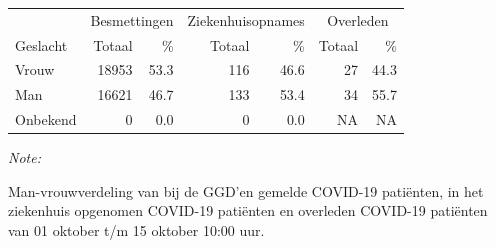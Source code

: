 \documentclass[
  english,
  man,floatsintext]{apa6}
\begin{document}
\begin{table}
\centering\begingroup\fontsize{11}{13}\selectfont

\begin{threeparttable}
\begin{tabular}{lrrrrrr}
\toprule
\multicolumn{1}{c}{ } & \multicolumn{2}{c}{Besmettingen} & \multicolumn{2}{c}{Ziekenhuisopnames} & \multicolumn{2}{c}{Overleden} \\
\cmidrule(l{3pt}r{3pt}){2-3} \cmidrule(l{3pt}r{3pt}){4-5} \cmidrule(l{3pt}r{3pt}){6-7}
Geslacht & Totaal & \% & Totaal & \% & Totaal & \%\\
\midrule
Vrouw & 18953 & 53.3 & 116 & 46.6 & 27 & 44.3\\
Man & 16621 & 46.7 & 133 & 53.4 & 34 & 55.7\\
Onbekend & 0 & 0.0 & 0 & 0.0 & NA & NA\\
\bottomrule
\end{tabular}
\begin{tablenotes}
\item \textit{Note: } 
\item Man-vrouwverdeling van bij de GGD’en gemelde COVID-19 patiënten, in het ziekenhuis opgenomen COVID-19 patiënten en overleden COVID-19 patiënten van 01 oktober t/m 15 oktober 10:00 uur.
\end{tablenotes}
\end{threeparttable}
\endgroup{}
\end{table}
\newpage
\end{document}
